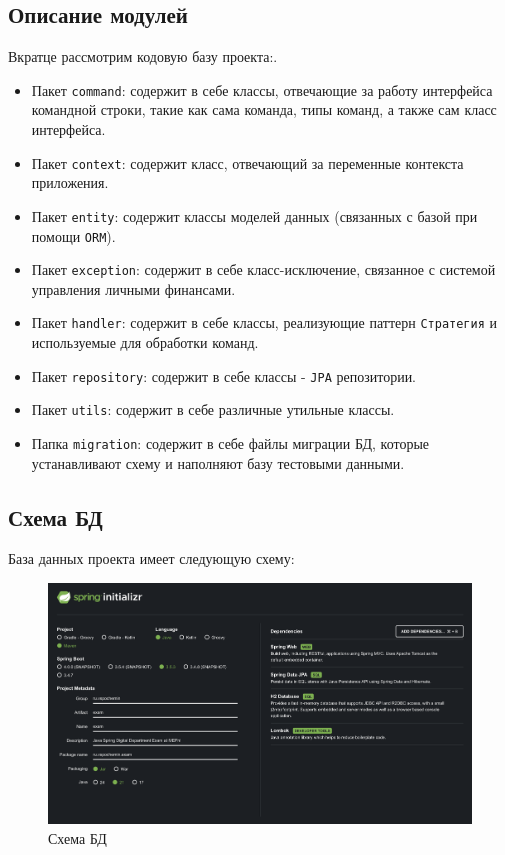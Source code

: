\documentclass[a4paper, 14pt]{article}
\begin{document}
\subsection{Описание модулей}

Вкратце рассмотрим кодовую базу проекта:.

\begin{itemize}
	\item Пакет \texttt{command}: содержит в себе классы, отвечающие за работу интерфейса командной строки, такие как сама команда, типы команд, а также сам класс интерфейса.
	\item Пакет \texttt{context}: содержит класс, отвечающий за переменные контекста приложения.
	\item Пакет \texttt{entity}: содержит классы моделей данных (связанных с базой при помощи \texttt{ORM}).
	\item Пакет \texttt{exception}: содержит в себе класс-исключение, связанное с системой управления личными финансами.
	\item Пакет \texttt{handler}: содержит в себе классы, реализующие паттерн \texttt{Стратегия} и используемые для обработки команд.
	\item Пакет \texttt{repository}: содержит в себе классы - \texttt{JPA} репозитории.
	\item Пакет \texttt{utils}: содержит в себе различные утильные классы.
	\item Папка \texttt{migration}: содержит в себе файлы миграции БД, которые устанавливают схему и наполняют базу тестовыми данными.
\end{itemize}

\subsection{Схема БД}

База данных проекта имеет следующую схему:

\begin{figure}[H]
	\centering
	\includegraphics[width=17cm]{resources/1.png}
	\caption{Схема БД}
\end{figure}
\end{document}
